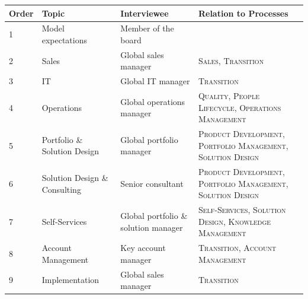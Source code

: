 \begin{table}[caption={Interviews and Relations to Processes}, label={tab:interv}]
	\centering
	
	\begin{tabular}{p{1cm} p{3.4cm}  p{4cm}  p{5cm} }
		\textbf{Order} & \textbf{Topic} & \textbf{Interviewee}          & \textbf{Relation to Processes}                          \\ \hline \hline
		1                            & Model expectations            & Member of the board                  &                                                                         \\\hline
		2                            & Sales                         & Global sales manager                 & \textsc{Sales}, \textsc{Transition}                                                       \\\hline
		3                            & IT                            & Global IT manager                    & \textsc{Transition}                                                              \\\hline
		4                            & Operations                    & Global operations manager            & \textsc{Quality}, \textsc{People Lifecycle}, \textsc{Operations Management} \\\hline
		5                            & Portfolio \& Solution Design  & Global portfolio manager             & \textsc{Product Development}, \textsc{Portfolio Management}, \textsc{Solution Design }             \\\hline
		6                            & Solution Design \& Consulting & Senior consultant                    & \textsc{Product Development}, \textsc{Portfolio Management}, \textsc{Solution Design}              \\\hline
		7                            & Self-Services     & Global portfolio \& solution manager & \textsc{Self-Services}, \textsc{Solution Design}, \textsc{Knowledge Management}                     \\\hline
		8                            & Account Management            & Key account manager                  & \textsc{Transition}, \textsc{Account Management  }                                                    \\\hline
		9                            & Implementation                & Global sales manager                 & \textsc{Transition}                                                             
	\end{tabular}
\end{table}

